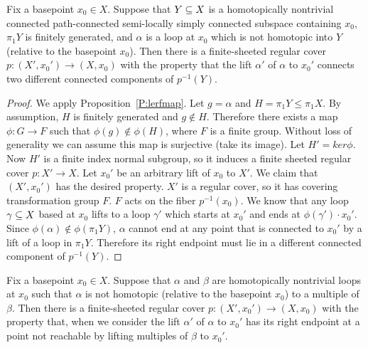 \begin{prop}\label{P:lerf1}

Fix a basepoint $x_0 \in X$.  Suppose that $Y \subseteq X$ is a homotopically
nontrivial connected path-connected semi-locally simply connected subspace
containing $x_0$, $\pi_1Y$ is finitely generated, and $\alpha$ is a loop at
$x_0$ which is not homotopic into $Y$ (relative to the basepoint $x_0$). Then
there is a finite-sheeted regular cover $p \colon (X',x_0') \to (X,x_0)$ with
the property that the lift $\alpha'$ of $\alpha$ to $x_0'$ connects two
different connected components of $p^{-1}(Y)$.

\end{prop}

\begin{proof}

We apply Proposition~\ref{P:lerfmap}. Let $g = \alpha$ and $H = \pi_1Y \leq
\pi_1X$.  By assumption, $H$ is finitely generated and $g \notin H$. Therefore
there exists a map $\phi \colon G \to F$ such that $\phi(g) \notin \phi(H)$,
where $F$ is a finite group.  Without loss of generality we can assume this map
is surjective (take its image). Let $H' = ker \phi$. Now $H'$ is a finite index
normal subgroup, so it induces a finite sheeted regular cover $p \colon X' \to
X$.  Let $x_0'$ be an arbitrary lift of $x_0$ to $X'$. We claim that
$(X',x_0')$ has the desired property.  $X'$ is a regular cover, so it has
covering transformation group $F$.  $F$ acts on the fiber $p^{-1}(x_0)$. We
know that any loop $\gamma \subseteq X$ based at $x_0$ lifts to a loop $\gamma'$
which starts at $x_0'$ and ends at $\phi(\gamma') \cdot x_0'$.  Since
$\phi(\alpha) \notin \phi(\pi_1Y)$, $\alpha$ cannot end at any point that is
connected to $x_0'$ by a lift of a loop in $\pi_1Y$.  Therefore its right
endpoint must lie in a different connected component of $p^{-1}(Y)$.

\end{proof}

\begin{prop}\label{P:lerf2}

Fix a basepoint $x_0 \in X$.  Suppose that $\alpha$ and $\beta$ are
homotopically nontrivial loops at $x_0$ such that $\alpha$ is not homotopic
(relative to the basepoint $x_0$) to a multiple of $\beta$.  Then there is
a finite-sheeted regular cover $p \colon (X',x_0') \to (X,x_0)$ with the
property that, when we consider the lift $\alpha'$ of $\alpha$ to $x_0'$ has
its right endpoint at a point not reachable by lifting multiples of $\beta$ to
$x_0'$.

\end{prop}

